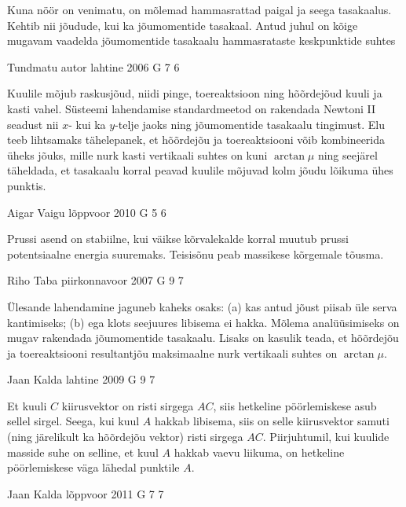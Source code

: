 \documentclass[11pt]{article}
\begin{document}
{{\ifHint
Kuna nöör on venimatu, on mõlemad hammasrattad paigal ja seega tasakaalus. Kehtib nii jõudude, kui ka jõumomentide tasakaal. Antud juhul on kõige mugavam vaadelda jõumomentide tasakaalu hammasrataste keskpunktide suhtes
\fi
}

{Tundmatu autor} %
{lahtine} %
{2006} %
{G 7} %
{6} %
{

\ifHint
Kuulile mõjub raskusjõud, niidi pinge, toereaktsioon ning hõõrdejõud kuuli ja kasti vahel. Süsteemi lahendamise standardmeetod on rakendada Newtoni II seadust nii $x$- kui ka $y$-telje jaoks ning jõumomentide tasakaalu tingimust. Elu teeb lihtsamaks tähelepanek, et hõõrdejõu ja toereaktsiooni võib kombineerida üheks jõuks, mille nurk kasti vertikaali suhtes on kuni $\arctan\mu$ ning seejärel täheldada, et tasakaalu korral peavad kuulile mõjuvad kolm jõudu lõikuma ühes punktis.
\fi
}

{Aigar Vaigu} %
{lõppvoor} %
{2010} %
{G 5} %
{6} %
{

\ifHint
Prussi asend on stabiilne, kui väikse kõrvalekalde korral muutub prussi potentsiaalne energia suuremaks. Teisisõnu peab massikese kõrgemale tõusma.
\fi
}

{Riho Taba} %
{piirkonnavoor} %
{2007} %
{G 9} %
{7} %
{

\ifHint
Ülesande lahendamine jaguneb kaheks osaks: (a) kas antud jõust piisab üle serva kantimiseks; (b) ega klots seejuures libisema ei hakka. Mõlema analüüsimiseks on mugav rakendada jõumomentide tasakaalu. Lisaks on kasulik teada, et hõõrdejõu ja toereaktsiooni resultantjõu maksimaalne nurk vertikaali suhtes on $\arctan \mu$.
\fi
}

{Jaan Kalda} %
{lahtine} %
{2009} %
{G 9} %
{7} %
{

\ifHint
Et kuuli $C$ kiirusvektor on risti sirgega $AC$, siis hetkeline pöörlemiskese asub sellel sirgel. Seega, kui kuul $A$ hakkab libisema, siis on selle kiirusvektor samuti (ning järelikult ka hõõrdejõu vektor) risti sirgega $AC$. Piirjuhtumil, kui kuulide masside suhe on selline, et kuul $A$ hakkab vaevu liikuma, on hetkeline pöörlemiskese väga lähedal punktile $A$.
\fi
}

{Jaan Kalda} %
{lõppvoor} %
{2011} %
{G 7} %
{7} %
{

}}
\end{document}
